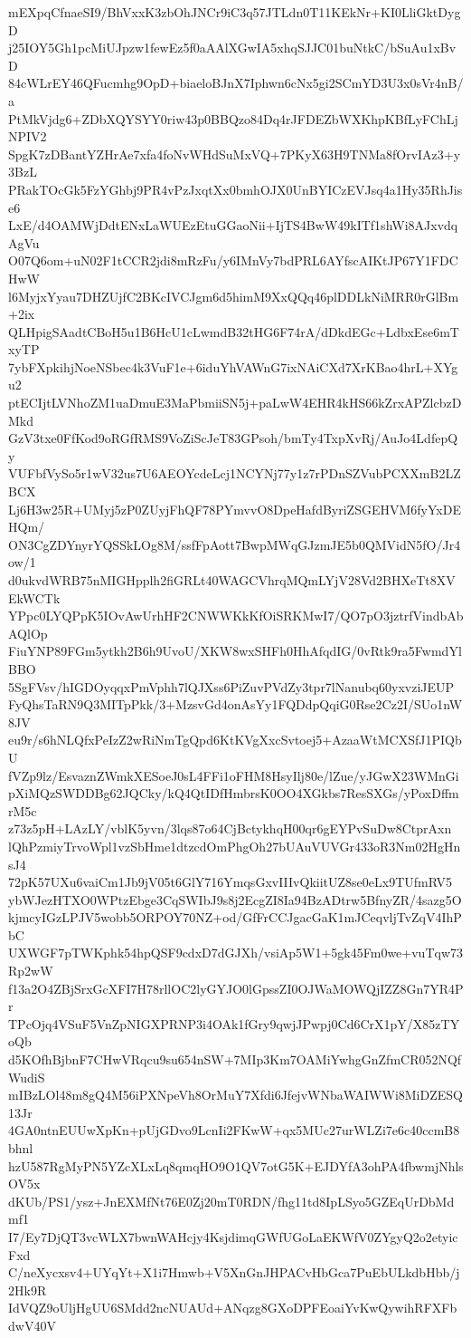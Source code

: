 mEXpqCfnaeSI9/BhVxxK3zbOhJNCr9iC3q57JTLdn0T11KEkNr+KI0LliGktDygD
j25IOY5Gh1pcMiUJpzw1fewEz5f0aAAlXGwIA5xhqSJJC01buNtkC/bSuAu1xBvD
84cWLrEY46QFucmhg9OpD+biaeloBJnX7Iphwn6cNx5gi2SCmYD3U3x0sVr4nB/a
PtMkVjdg6+ZDbXQYSYY0riw43p0BBQzo84Dq4rJFDEZbWXKhpKBfLyFChLjNPIV2
SpgK7zDBantYZHrAe7xfa4foNvWHdSuMxVQ+7PKyX63H9TNMa8fOrvIAz3+y3BzL
PRakTOcGk5FzYGhbj9PR4vPzJxqtXx0bmhOJX0UnBYICzEVJsq4a1Hy35RhJise6
LxE/d4OAMWjDdtENxLaWUEzEtuGGaoNii+IjTS4BwW49kITf1shWi8AJxvdqAgVu
O07Q6om+uN02F1tCCR2jdi8mRzFu/y6IMnVy7bdPRL6AYfscAIKtJP67Y1FDCHwW
l6MyjxYyau7DHZUjfC2BKcIVCJgm6d5himM9XxQQq46plDDLkNiMRR0rGlBm+2ix
QLHpigSAadtCBoH5u1B6HcU1cLwmdB32tHG6F74rA/dDkdEGc+LdbxEse6mTxyTP
7ybFXpkihjNoeNSbec4k3VuF1e+6iduYhVAWnG7ixNAiCXd7XrKBao4hrL+XYgu2
ptECIjtLVNhoZM1uaDmuE3MaPbmiiSN5j+paLwW4EHR4kHS66kZrxAPZlcbzDMkd
GzV3txe0FfKod9oRGfRMS9VoZiScJeT83GPsoh/bmTy4TxpXvRj/AuJo4LdfepQy
VUFbfVySo5r1wV32us7U6AEOYcdeLcj1NCYNj77y1z7rPDnSZVubPCXXmB2LZBCX
Lj6H3w25R+UMyj5zP0ZUyjFhQF78PYmvvO8DpeHafdByriZSGEHVM6fyYxDEHQm/
ON3CgZDYnyrYQSSkLOg8M/ssfFpAott7BwpMWqGJzmJE5b0QMVidN5fO/Jr4ow/1
d0ukvdWRB75nMIGHpplh2fiGRLt40WAGCVhrqMQmLYjV28Vd2BHXeTt8XVEkWCTk
YPpc0LYQPpK5IOvAwUrhHF2CNWWKkKfOiSRKMwI7/QO7pO3jztrfVindbAbAQlOp
FiuYNP89FGm5ytkh2B6h9UvoU/XKW8wxSHFh0HhAfqdIG/0vRtk9ra5FwmdYlBBO
5SgFVsv/hIGDOyqqxPmVphh7lQJXss6PiZuvPVdZy3tpr7lNanubq60yxvziJEUP
FyQhsTaRN9Q3MITpPkk/3+MzsvGd4onAsYy1FQDdpQqiG0Rse2Cz2I/SUo1nW8JV
eu9r/s6hNLQfxPeIzZ2wRiNmTgQpd6KtKVgXxcSvtoej5+AzaaWtMCXSfJ1PIQbU
fVZp9lz/EsvaznZWmkXESoeJ0sL4FFi1oFHM8HsyIlj80e/lZue/yJGwX23WMnGi
pXiMQzSWDDBg62JQCky/kQ4QtIDfHmbrsK0OO4XGkbs7ResSXGs/yPoxDffmrM5c
z73z5pH+LAzLY/vblK5yvn/3lqs87o64CjBctykhqH00qr6gEYPvSuDw8CtprAxn
lQhPzmiyTrvoWpl1vzSbHme1dtzcdOmPhgOh27bUAuVUVGr433oR3Nm02HgHnsJ4
72pK57UXu6vaiCm1Jb9jV05t6GlY716YmqsGxvIIIvQkiitUZ8se0eLx9TUfmRV5
ybWJezHTXO0WPtzEbge3CqSWIbJ9s8j2EcgZI8Ia94BzADtrw5BfnyZR/4sazg5O
kjmcyIGzLPJV5wobb5ORPOY70NZ+od/GfFrCCJgacGaK1mJCeqvljTvZqV4IhPbC
UXWGF7pTWKphk54hpQSF9cdxD7dGJXh/vsiAp5W1+5gk45Fm0we+vuTqw73Rp2wW
f13a2O4ZBjSrxGcXFI7H78rllOC2lyGYJO0lGpssZI0OJWaMOWQjIZZ8Gn7YR4Pr
TPcOjq4VSuF5VnZpNIGXPRNP3i4OAk1fGry9qwjJPwpj0Cd6CrX1pY/X85zTYoQb
d5KOfhBjbnF7CHwVRqcu9su654nSW+7MIp3Km7OAMiYwhgGnZfmCR052NQfWudiS
mIBzLOl48m8gQ4M56iPXNpeVh8OrMuY7Xfdi6JfejvWNbaWAIWWi8MiDZESQ13Jr
4GA0ntnEUUwXpKn+pUjGDvo9LcnIi2FKwW+qx5MUc27urWLZi7e6c40ccmB8bhnl
hzU587RgMyPN5YZcXLxLq8qmqHO9O1QV7otG5K+EJDYfA3ohPA4fbwmjNhlsOV5x
dKUb/PS1/ysz+JnEXMfNt76E0Zj20mT0RDN/fhg11td8IpLSyo5GZEqUrDbMdmf1
I7/Ey7DjQT3vcWLX7bwnWAHcjy4KsjdimqGWfUGoLaEKWfV0ZYgyQ2o2etyicFxd
C/neXycxsv4+UYqYt+X1i7Hmwb+V5XnGnJHPACvHbGca7PuEbULkdbHbb/j2Hk9R
IdVQZ9oUljHgUU6SMdd2ncNUAUd+ANqzg8GXoDPFEoaiYvKwQywihRFXFbdwV40V
